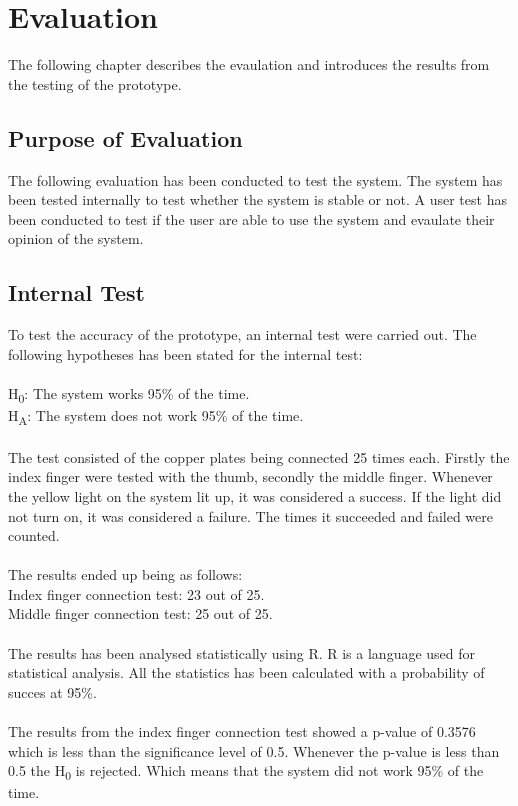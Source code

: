 \chapter{Evaluation}

The following chapter describes the evaulation and introduces the results from the testing of the prototype. 

\section{Purpose of Evaluation}

The following evaluation has been conducted to test the system. The system has been tested internally to test whether the system is stable or not. 
A user test has been conducted to test if the user are able to use the system and evaulate their opinion of the system. 


\section{Internal Test}

To test the accuracy of the prototype, an internal test were carried out. The following hypotheses has been stated for the internal test: \\\\
H\textsubscript{0}: The system works 95\% of the time.\\
H\textsubscript{A}: The system does not work 95\% of the time.\\\\

The test consisted of the copper plates being connected 25 times each. Firstly the index finger were tested with the thumb, secondly the middle finger. Whenever the yellow light on the system
lit up, it was considered a success. If the light did not turn on, it was considered a failure. The times it succeeded and failed were counted.\\\\

The results ended up being as follows:\\
Index finger connection test: 23 out of 25. \\
Middle finger connection test: 25 out of 25.\\\\


The results has been analysed statistically using R\citep{R}. R is a language used for statistical analysis. All the statistics has been calculated with a probability of succes at 95\%.\\\\
The results from the index finger connection test showed a p-value of 0.3576 which is less than the significance level of 0.5. 
Whenever the p-value is less than 0.5 the H\textsubscript{0} is rejected. Which means that the system did not work 95\% of the time. \\

